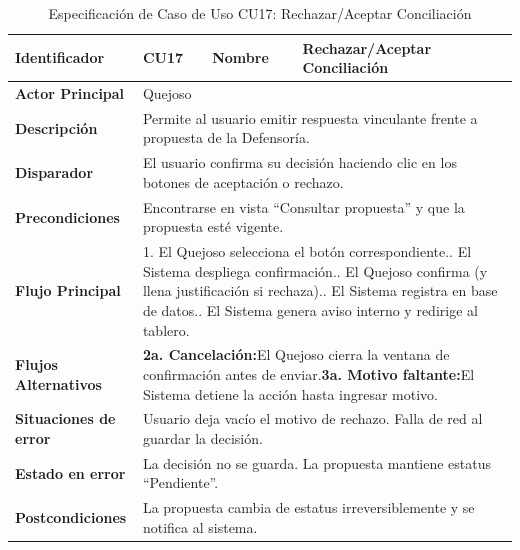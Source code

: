 \vspace{0.8cm}

\begingroup
\setlength{\parskip}{0pt}
\begin{longtable}{|p{3.5cm}|p{2cm}|p{2.5cm}|p{7cm}|}
\caption{Especificación de Caso de Uso CU17: Rechazar/Aceptar Conciliación}
\label{tab:cu17_conciliacion} \\
\hline
\textbf{Identificador} & CU17 & \textbf{Nombre} & Rechazar/Aceptar Conciliación \\ \hline
\textbf{Actor Principal} & \multicolumn{3}{p{11.5cm}|}{Quejoso} \\ \hline
\textbf{Descripción} & \multicolumn{3}{p{11.5cm}|}{Permite al usuario emitir respuesta vinculante frente a propuesta de la Defensoría.} \\ \hline
\textbf{Disparador} & \multicolumn{3}{p{11.5cm}|}{El usuario confirma su decisión haciendo clic en los botones de aceptación o rechazo.} \\ \hline
\textbf{Precondiciones} & \multicolumn{3}{p{11.5cm}|}{Encontrarse en vista ``Consultar propuesta'' y que la propuesta esté vigente.} \\ \hline
\textbf{Flujo Principal} & \multicolumn{3}{p{11.5cm}|}{1. El Quejoso selecciona el botón correspondiente.\newline 2. El Sistema despliega confirmación.\newline 3. El Quejoso confirma (y llena justificación si rechaza).\newline 4. El Sistema registra en base de datos.\newline 5. El Sistema genera aviso interno y redirige al tablero.} \\ \hline
\textbf{Flujos Alternativos} & \multicolumn{3}{p{11.5cm}|}{\textbf{2a. Cancelación:}\newline El Quejoso cierra la ventana de confirmación antes de enviar.\newline\newline \textbf{3a. Motivo faltante:}\newline El Sistema detiene la acción hasta ingresar motivo.} \\ \hline
\textbf{Situaciones de error} & \multicolumn{3}{p{11.5cm}|}{Usuario deja vacío el motivo de rechazo. Falla de red al guardar la decisión.} \\ \hline
\textbf{Estado en error} & \multicolumn{3}{p{11.5cm}|}{La decisión no se guarda. La propuesta mantiene estatus ``Pendiente''.} \\ \hline
\textbf{Postcondiciones} & \multicolumn{3}{p{11.5cm}|}{La propuesta cambia de estatus irreversiblemente y se notifica al sistema.} \\ \hline
\end{longtable}
\endgroup

